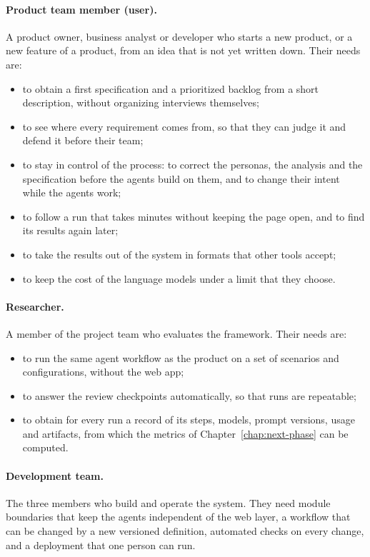 \paragraph{Product team member (user).} A product owner, business analyst or developer who starts a new product, or a new feature of a product, from an idea that is not yet written down. Their needs are:
\begin{itemize}
    \item to obtain a first specification and a prioritized backlog from a short description, without organizing interviews themselves;
    \item to see where every requirement comes from, so that they can judge it and defend it before their team;
    \item to stay in control of the process: to correct the personas, the analysis and the specification before the agents build on them, and to change their intent while the agents work;
    \item to follow a run that takes minutes without keeping the page open, and to find its results again later;
    \item to take the results out of the system in formats that other tools accept;
    \item to keep the cost of the language models under a limit that they choose.
\end{itemize}

\paragraph{Researcher.} A member of the project team who evaluates the framework. Their needs are:
\begin{itemize}
    \item to run the same agent workflow as the product on a set of scenarios and configurations, without the web app;
    \item to answer the review checkpoints automatically, so that runs are repeatable;
    \item to obtain for every run a record of its steps, models, prompt versions, usage and artifacts, from which the metrics of Chapter~\ref{chap:next-phase} can be computed.
\end{itemize}

\paragraph{Development team.} The three members who build and operate the system. They need module boundaries that keep the agents independent of the web layer, a workflow that can be changed by a new versioned definition, automated checks on every change, and a deployment that one person can run.

